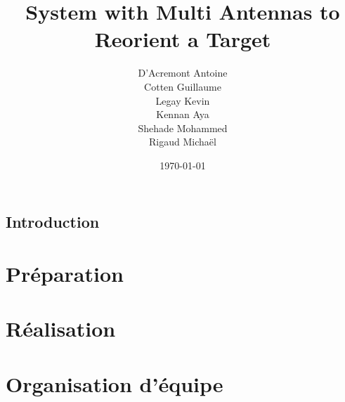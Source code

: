 \documentclass[a4paper, 11pt, oneside, oldfontcommands]{memoir}
\title{System with Multi Antennas to Reorient a Target}
\author{D'Acremont Antoine\\Cotten Guillaume\\Legay Kevin\\Kennan Aya\\Shehade Mohammed\\Rigaud Michaël}
\date{\today}
\newcounter{th}[chapter]
\begin{document}
\maketitle
\thispagestyle{empty}
\newpage

\tableofcontents





\chapter*{Introduction}


\newpage	  


% 
% 
% 
% 
% 

%
%


\part{Préparation}





\part{Réalisation}






\part{Organisation d'équipe}



\end{document}
